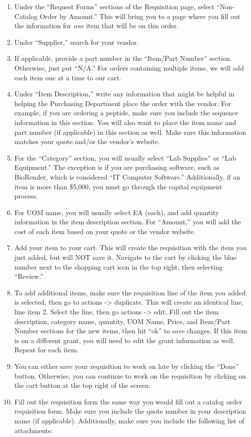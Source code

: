 \documentclass[
]{book}
\begin{document}
\begin{enumerate}
\def\labelenumi{\arabic{enumi}.}
\item
  Under the ``Request Forms'' sections of the Requisition page, select ``Non-Catalog Order by Amount.'' This will bring you to a page where you fill out the information for \emph{one} item that will be on this order.
\item
  Under ``Supplier,'' search for your vendor.
\item
  If applicable, provide a part number in the ``Item/Part Number'' section. Otherwise, just put ``N/A.'' For orders containing multiple items, we will add each item one at a time to our cart.
\item
  Under ``Item Description,'' write any information that might be helpful in helping the Purchasing Department place the order with the vendor. For example, if you are ordering a peptide, make sure you include the sequence information in this section. You will also want to place the item name and part number (if applicable) in this section as well. Make sure this information matches your quote and/or the vendor's website.
\item
  For the ``Category'' section, you will usually select ``Lab Supplies'' or ``Lab Equipment.'' The exception is if you are purchasing software, such as BioRender, which is considered ``IT Computer Software.'' Additionally, if an item is more than \$5,000, you must go through the capital equipment process.
\item
  For UOM name, you will usually select EA (each), and add quantity information in the item description section. For ``Amount,'' you will add the cost of each item based on your quote or the vendor website.
\item
  Add your item to your cart. This will create the requisition with the item you just added, but will NOT save it. Navigate to the cart by clicking the blue number next to the shopping cart icon in the top right, then selecting ``Review.''
\item
  To add additional items, make sure the requisition line of the item you added is selected, then go to actions -\textgreater{} duplicate. This will create an identical line, line item 2. Select the line, then go actions -\textgreater{} edit. Fill out the item description, category name, quantity, UOM Name, Price, and Item/Part Number sections for the new items, then hit ``ok'' to save changes. If this item is on a different grant, you will need to edit the grant information as well. Repeat for each item.
\item
  You can either save your requisition to work on late by clicking the ``Done'' button. Otherwise, you can continue to work on the requisition by clicking on the cart button at the top right of the screen.
\item
  Fill out the requisition form the same way you would fill out a catalog order requisition form. Make sure you include the quote number in your description name (if applicable). Additionally, make sure you include the following list of attachments:


\end{enumerate}
\end{document}
